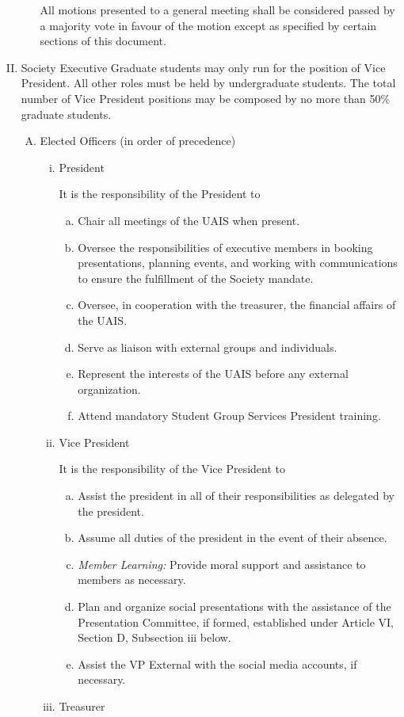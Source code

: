 \documentclass[11pt]{article}
\begin{document}
\begin{enumerate}[I.]
\begin{enumerate}[A)]
      All motions presented to a general meeting shall be considered passed by a majority vote in favour of the motion except as specified by certain
      sections of this document.
    \end{enumerate}
  \item Society Executive
  Graduate students may only run for the position of Vice President. All other roles must be held by undergraduate students. The total number of Vice President positions may be composed by no more than 50\% graduate students.
    \begin{enumerate}[A)]
      \item Elected Officers (in order of precedence)
        \begin{enumerate}[i)]
          \item President

          It is the responsibility of the President to
            \begin{enumerate}[a)]
              \item Chair all meetings of the UAIS when present.
              \item Oversee the responsibilities of executive members in booking presentations, planning events, and working with communications to ensure the fulfillment of the Society mandate.
              \item Oversee, in cooperation with the treasurer, the financial affairs of the UAIS.
              \item Serve as liaison with external groups and individuals.
              \item Represent the interests of the UAIS before any external
                organization.
              \item Attend mandatory Student Group Services President training.

            \end{enumerate}
          \item Vice President

          It is the responsibility of the Vice President to
            \begin{enumerate}[a)]
              \item Assist the president in all of their responsibilities as
                delegated by the president.
              \item Assume all duties of the president in the event of their
                absence.
             \item \textit{Member Learning:} Provide moral support and assistance to members as necessary.
              \item Plan and organize social presentations with the assistance of the Presentation Committee, if formed, established under Article VI, Section D, Subsection iii below.
             \item Assist the VP External with the social media accounts, if necessary.
            \end{enumerate}
          \item Treasurer


\end{enumerate}
\end{enumerate}
\end{enumerate}
\end{document}
